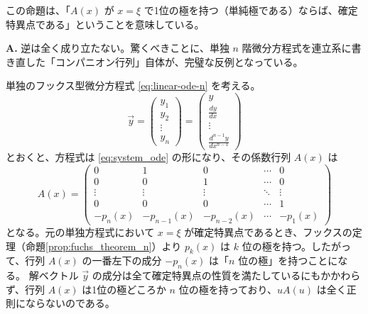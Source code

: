 この命題は、「$A(x)$ が $x=\xi$ で1位の極を持つ（単純極である）ならば、確定特異点である」ということを意味している。

\begin{Q}[【核心】上記の命題の逆、すなわち「$x=\xi$ が確定特異点ならば、必ず $B(u)$ は正則になる（$A(x)$ は高々1位の極しか持たない）」は成立するか？成り立たないとすれば、どのような反例があるか？]
\textbf{A.} 逆は全く成り立たない。驚くべきことに、単独 $n$ 階微分方程式を連立系に書き直した「コンパニオン行列」自体が、完璧な反例となっている。

単独のフックス型微分方程式 \eqref{eq:linear-ode-n} を考える。
\[
\vec{y}=
\begin{pmatrix}
    y_{1} \\ y_{2} \\ \vdots \\ y_{n}
\end{pmatrix}
=
\begin{pmatrix}
    y \\ \frac{dy}{dx} \\ \vdots \\ \frac{d^{n-1}y}{dx^{n-1}}
\end{pmatrix}
\]
とおくと、方程式は \eqref{eq:system_ode} の形になり、その係数行列 $A(x)$ は
\[
A(x)=
\begin{pmatrix}
    0 & 1 & 0 &\cdots & 0 \\
    0 & 0 & 1 & \cdots & 0\\
    \vdots&\vdots&\vdots& \ddots &\vdots\\
    0 & 0 & 0 & \cdots & 1 \\
    -p_{n}(x) & -p_{n-1}(x) & -p_{n-2}(x) & \cdots & -p_{1}(x)
\end{pmatrix}
\]
となる。元の単独方程式において $x=\xi$ が確定特異点であるとき、フックスの定理（命題\ref{prop:fuchs_theorem_n}）より $p_{k}(x)$ は $k$ 位の極を持つ。したがって、行列 $A(x)$ の一番左下の成分 $-p_{n}(x)$ は「$n$ 位の極」を持つことになる。
解ベクトル $\vec{y}$ の成分は全て確定特異点の性質を満たしているにもかかわらず、行列 $A(x)$ は1位の極どころか $n$ 位の極を持っており、$u A(u)$ は全く正則にならないのである。
\end{Q}

